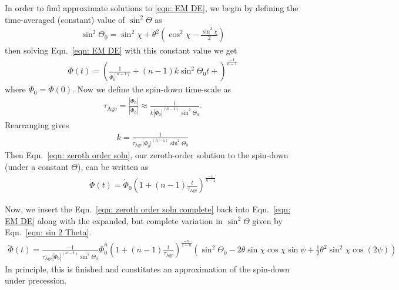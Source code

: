 \documentclass[../full_thesis/full_thesis.tex]{subfiles}
\newcommand{\tauAge}{\tau_{\mathrm{Age}}}
\begin{document}
In order to find approximate solutions to \eqref{eqn: EM DE}, we begin by defining
the time-averaged (constant) value of $\sin^{2}\Theta$ as
\begin{align}
\sin^{2}\Theta_0 =
\sin^{2}\chi + \theta^{2}\left(\cos^{2}\chi - \frac{\sin^{2}\chi}{2}\right)
\label{eqn: sin2Theta0}
\end{align}
then solving Eqn.~\eqref{eqn: EM DE} with this constant value we get
\begin{align}
\dot{\Phi}(t) = \left(\frac{1}{\dot{\Phi}_0^{(n-1)}} + (n-1)k\sin^{2}\Theta_0 t + \right)^{\frac{-1}{n-1}}
\label{eqn: zeroth order soln}
\end{align}
where $\dot{\Phi}_0 = \dot{\Phi}(0)$. Now we define the spin-down time-scale as
\begin{align}
\tauAge = \frac{|\dot{\Phi}_0|}{|\ddot{\Phi}_0|}
\approx \frac{1}{k|\dot{\Phi}_0|^{(n-1)} \sin^{2}\Theta_0}.
\end{align}
Rearranging gives
\begin{align}
k = \frac{1}{\tauAge \dot{|\Phi}_0|^{(n-1)} \sin^{2}\Theta_0}
\end{align}
Then Eqn.~\eqref{eqn: zeroth order soln}, our zeroth-order solution to the
spin-down (under a constant $\Theta$), can be written as
\begin{align}
\dot{\Phi}(t) = \dot{\Phi}_0\left(1 + (n-1)\frac{t}{\tauAge}\right)^{\frac{-1}{n-1}}
\label{eqn: zeroth order soln complete}
\end{align}

Now, we insert the Eqn.~\eqref{eqn: zeroth order soln complete} back into
Eqn.~\eqref{eqn: EM DE} along with the expanded, but complete variation in
$\sin^{2}\Theta$ given by Eqn.~\eqref{eqn: sin 2 Theta}.
\begin{align}
\ddot{\Phi}(t) = \frac{-1}{\tauAge |\dot{\Phi}_0|^{(n-1)} \sin^{2}\Theta_0}
\dot{\Phi}_0^n\left(1 + (n-1)\frac{t}{\tauAge}\right)^{\frac{-n}{1-n}}
\left(\sin^{2}\Theta_0
- 2\theta \sin\chi\cos\chi \sin\psi
 + \frac{1}{2}\theta^{2}\sin^{2}\chi\cos(2\psi)
\right)
\end{align}
In principle, this is finished and constitutes an approximation of the spin-down
under precession.
\end{document}

